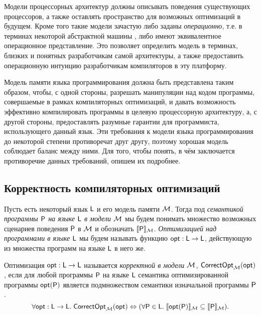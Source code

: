 Модели процессорных архитектур должны описывать поведения существующих процессоров, а также оставлять пространство
для возможных оптимизаций в будущем.
Кроме того такие модели зачастую либо заданы \emph{операционно}, т.е. в терминах некоторой
абстрактной машины \cite{Diehl-al:FGCS00}, либо имеют эквивалентное операционное представление.
Это позволяет определить модель в терминах, близких и понятных разработчикам самой архитектуры, а также предоставить
операционную интуицию разработчикам компиляторов в эту платформу.

Модель памяти языка программирования должна быть представлена таким образом, чтобы, с одной стороны,
разрешать манипуляции над кодом программы, совершаемые в рамках компиляторных оптимизаций, и давать возможность
эффективно компилировать программы в целевую процессорную архитектуру, а, с другой стороны, предоставлять
разумные гарантии для программиста, использующего данный язык.
Эти требования к модели языка программирования до некоторой степени противоречат друг другу, поэтому хорошая модель
соблюдает баланс между ними.
Для того, чтобы понять, в чём заключается противоречие данных требований, опишем их подробнее.

\subsection{Корректность компиляторных оптимизаций}
Пусть есть некоторый язык $\mathsf{L}$ и его модель памяти $\mathcal{M}$. Тогда под \emph{семантикой программы $\mathsf{P}$ на языке $\mathsf{L}$ в модели $\mathcal{M}$}
мы будем понимать множество возможных сценариев поведения $\mathsf{P}$ в $\mathcal{M}$ и обозначать $\llbracket \mathsf{P} \rrbracket_{\mathcal{M}}$.
\emph{Оптимизацией над программами в языке $\mathsf{L}$} мы будем называть функцию $\mathsf{opt} : \mathsf{L} \rightarrow \mathsf{L}$, действующую из
множества программ на языке $\mathsf{L}$ в него же.
\begin{definition}
  Оптимизация $\mathsf{opt} : \mathsf{L} \rightarrow \mathsf{L}$ называется \emph{корректной в модели $\mathcal{M}$},
  $\mathsf{CorrectOpt}_{\mathcal{M}}(\mathsf{opt})$, если для любой программы $\mathsf{P}$ на языке $\mathsf{L}$
  семантика оптимизированной программы $\mathsf{opt}(\mathsf{P})$ является подмножеством семантики изначальной программы $\mathsf{P}$.
  \[\forall \mathsf{opt} : \mathsf{L} \rightarrow \mathsf{L}. \; \mathsf{CorrectOpt}_{\mathcal{M}}(\mathsf{opt}) \Leftrightarrow (\forall \mathsf{P} \in \mathsf{L}. \; \llbracket \mathsf{opt}(\mathsf{P}) \rrbracket_{\mathcal{M}} \subseteq \llbracket \mathsf{P} \rrbracket_{\mathcal{M}}). \]
\end{definition}

